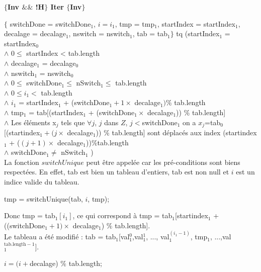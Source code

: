 \textbf{$\{$Inv $\&\&$ !H$\}$ Iter $\{$Inv$\}$}

$\{$ switchDone = switchDone$_{1}$, $i = i_{1}$, tmp = tmp$_{1}$, startIndex = startIndex$_{1}$, decalage = decalage$_{1}$, nswitch = nswitch$_{1}$, tab = tab$_{1} \}$ tq (startIndex$_{1}$ = startIndex$_{0}$\\
$\wedge$ $0 \leq$ startIndex < tab.length \\
$\wedge$ decalage$_{1}$ = decalage$_{0}$\\
$\wedge$ nswitch$_{1}$ = nswitch$_{0}$\\
$\wedge$ $0\leq$ switchDone$_{1} \leq$ nSwitch$_{1} \leq$ tab.length\\
$\wedge$ $0\leq i_{1} <$ tab.length\\
$\wedge$ $i_{1}$ = startIndex$_{1}$ + (switchDone$_{1}+1\times $ decalage$_{1}) \%$ tab.length\\
$\wedge$ tmp$_{1}$ = tab[(startIndex$_{1}$ + (switchDone$_{1}\times$  decalage$_{1}$)) $\%$ tab.length]\\
$\wedge$ Les éléments x$_{j}$ tels que $\forall j$, $j$ dans $Z$, $j<$switchDone$_{1}$ on a $x_{j}$=tab$_{0}$[(startindex$_{1} + (j\times$ decalage$_{1}$)) $\%$ tab.length] sont déplacés aux index (startindex$_{1}$ + ($(j+1)\times$ decalage$_{1}$))$\%$tab.length\\
$\wedge$ switchDone$_{1} \neq$ nSwitch$_{1}$ )\\

La fonction $switchUnique$ peut être appelée car les pré-conditions sont biens respectées. En effet, tab est bien un tableau d'entiers, tab est non null et $i$ est un indice valide du tableau. 

\begin{center}
tmp = switchUnique(tab, $i$, tmp);\\
\end{center}

Donc tmp = tab$_{1}[i_1]$, ce qui correspond à tmp = tab$_{1}$[startindex$_{1}$ + ((switchDone$_{1}+1)\times$ decalage$_{1}$) $\%$ tab.length].\\

Le tableau a été modifié : tab = tab$_{1}$[val$_{1}^{0}$,val$_{1}^{1}$, ..., val$_{1}^{(i_{1}-1)}$, tmp$_{1}$, ...,val$_{1}^{\mathrm{tab.length-1}}]$.

\begin{center}
  $i = (i+$decalage) $\%$ tab.length;\\
\end{center} 
 
